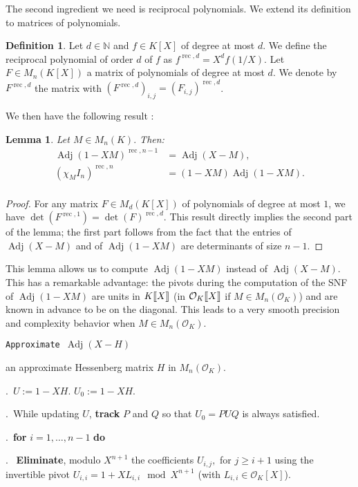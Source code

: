 \documentclass[sigconf]{acmart}
\DeclareMathOperator{\adj}{Adj}
\DeclareMathOperator{\rec}{rec}
\newcommand{\OK}{\mathcal{O}_K}
\newcommand{\llb}{[\mkern-2.5mu[}
\newcommand{\rrb}{]\mkern-2.5mu]}
\newtheorem{lem}[theo]{Lemma}
\theoremstyle{definition}
\newtheorem{deftn}[theo]{Definition}
\begin{document}
The second ingredient we need is reciprocal polynomials.
We extend its definition to matrices of polynomials.
\begin{deftn}
Let $d \in \mathbb{N}$ and $f \in K[X]$ of degree at most $d.$ 
We define the reciprocal polynomial of order $d$ of $f$ as $f^{\rec,d}=X^d f \left( 1/X \right).$
Let $F \in M_n(K[X])$ a matrix of polynomials of degree at most $d.$
We denote by $F^{\rec,d}$ the matrix with $(F^{\rec,d})_{i,j} = (F_{i,j})^{\rec,d}$.
\end{deftn}
We then have the following result :
\begin{lem}
Let $M \in M_n(K).$ Then:
\begin{align*}
\adj(1-XM)^{\rec,n-1}&=\adj(X-M), \\
(\chi_M I_n)^{\rec,n}&=(1-XM) \adj(1-XM).\\
\end{align*}
\end{lem}
\begin{proof}
For any matrix $F \in M_d(K[X])$ of polynomials of degree at most $1$,
we have $\det (F^{\rec,1})=\det(F)^{\rec,d}.$
This result directly implies the second part of the lemma; the first part follows
from the fact that the entries of $\adj(X-M)$ and of $\adj(1-XM)$
are determinants of size $n-1$.
\end{proof}

This lemma allows us to compute $\adj(1-XM)$ instead of $\adj(X-M).$
This has a remarkable advantage: the pivots during the computation of
the SNF of $\adj(1-XM)$ are units in $K\llb X\rrb$ (in $\OK\llb X\rrb$ if $M \in M_n(\OK)$) and are known
in advance to be on the diagonal. This leads to a very smooth
precision and complexity behavior when $M \in M_n(\OK).$ 

\noindent\hrulefill

 {\tt Approximate $\adj (X -H)$ }

 an approximate Hessenberg matrix $H$ in $M_n(\OK).$

\smallskip

.\ $U:=1-XH.$ $U_0:=1-XH.$

.\ While updating $U$, \textbf{track} $P$ and $Q$ so that $U_0=PUQ$ is always satisfied.

.\ {\bf for} $i=1,\dots,n-1$ {\bf do} 

.\  \:  \textbf{Eliminate}, modulo $X^{n+1}$ the coefficients $U_{i,j},$ for $j\geq i+1$ 
using the invertible pivot
$U_{i,i}=1+XL_{i,i} \mod X^{n+1}$ (with $L_{i,i} \in \OK[X]$). 
\end{document}
